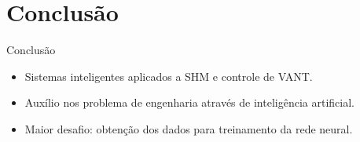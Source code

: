 \section{Conclusão}

\begin{frame}{Conclusão}
\begin{itemize}
    \item Sistemas inteligentes aplicados a SHM e controle de VANT.
    \item Auxílio nos problema de engenharia através de inteligência artificial.
    \item \alert{Maior desafio:} obtenção dos dados para treinamento da rede neural.
\end{itemize}
\end{frame}